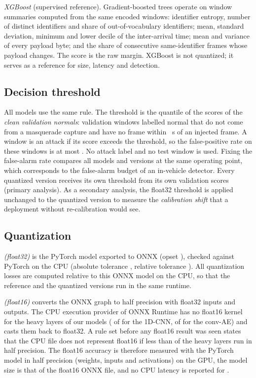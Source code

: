 \emph{XGBoost} (supervised reference). Gradient-boosted trees operate on \NSummaryFeatures{} window summaries
computed from the same encoded windows: identifier entropy, number of distinct identifiers and share of
out-of-vocabulary identifiers; mean, standard deviation, minimum and lower decile of the inter-arrival time; mean
and variance of every payload byte; and the share of consecutive same-identifier frames whose payload changes. The
score is the raw margin. XGBoost is not quantized; it serves as a reference for size, latency and detection.

\subsection{Decision threshold}
All models use the same rule. The threshold is the \CalibQuantile{} quantile of the scores of the \emph{clean
validation normals}: validation windows labelled normal that do not come from a masquerade capture and have no
frame within \NormalMarginS~s of an injected frame. A window is an attack if its score exceeds the threshold, so
the false-positive rate on these windows is at most \TargetFPR. No attack label and no test window is used. Fixing
the false-alarm rate compares all models and versions at the same operating point, which corresponds to the
false-alarm budget of an in-vehicle detector. Every quantized version receives its own threshold from its own
validation scores (primary analysis). As a secondary analysis, the float32 threshold is applied unchanged to the
quantized version to measure the \emph{calibration shift} that a deployment without re-calibration would see.

\subsection{Quantization}
\emph{\Qfp{} (float32)} is the PyTorch model exported to ONNX (opset \Opset), checked against PyTorch on the CPU
(absolute tolerance \QZeroAtol, relative tolerance \QZeroRtol). All quantization losses are computed relative to
this ONNX model on the CPU, so that the reference and the quantized versions run in the same runtime.

\emph{\Qhalf{} (float16)} converts the ONNX graph to half precision with float32 inputs and outputs. The CPU
execution provider of ONNX Runtime has no float16 kernel for the heavy layers of our models (\HeavyFPCNN{} of
\HeavyCNN{} for the 1D-CNN, \HeavyFPAE{} of \HeavyAE{} for the conv-AE) and casts them back to float32. A rule set
before any float16 result was seen states that the CPU file does not represent float16 if less than
\MinHeavyFPShare{} of the heavy layers run in half precision. The float16 accuracy is therefore measured with the
PyTorch model in half precision (weights, inputs and activations) on the GPU, the model size is that of the float16
ONNX file, and no CPU latency is reported for \Qhalf.


